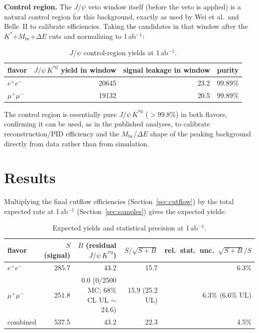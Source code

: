 \documentclass[11pt]{article}
\newcommand{\Kst}{K^{*0}}
\newcommand{\Mbc}{M_{\mathrm{bc}}}
\newcommand{\dE}{\Delta E}
\newcommand{\jpsi}{J/\psi}
\begin{document}
\textbf{Control region.} The $\jpsi$ veto window itself (before the
veto is applied) is a natural control region for this background,
exactly as used by Wei et al.\ and Belle~II to calibrate efficiencies.
Taking the candidates in that window after the $K^{*}$+$\Mbc$+$\dE$ cuts
and normalizing to 1\,ab$^{-1}$:

\begin{table}[htbp]
\centering
\begin{tabular}{lrrr}
\toprule
flavor & $\jpsi\,\Kst$ yield in window & signal leakage in window & purity \\
\midrule
$e^+e^-$ & 20645 & 23.2 & 99.89\% \\
$\mu^+\mu^-$ & 19132 & 20.5 & 99.89\% \\
\bottomrule
\end{tabular}
\caption{$\jpsi$ control-region yields at 1\,ab$^{-1}$.}
\label{tab:cr}
\end{table}

The control region is essentially pure $\jpsi\,\Kst$ ($>$99.8\%) in
both flavors, confirming it can be used, as in the published analyses,
to calibrate reconstruction/PID efficiency and the $\Mbc$/$\dE$ shape of
the peaking background directly from data rather than from simulation.

\section{Results}
\label{sec:results}

Multiplying the final cutflow efficiencies (Section~\ref{sec:cutflow})
by the total expected rate at 1\,ab$^{-1}$ (Section~\ref{sec:samples})
gives the expected yields:

\begin{table}[htbp]
\centering\footnotesize
\setlength{\tabcolsep}{5pt}
\begin{tabular}{lrrrr}
\toprule
flavor & $S$ (signal) & $B$ (residual $\jpsi\,\Kst$) & $S/\sqrt{S+B}$ & rel.\ stat.\ unc.\ $\sqrt{S+B}/S$ \\
\midrule
$e^+e^-$ & 285.7 & 43.2 & 15.7 & 6.3\% \\
$\mu^+\mu^-$ & 251.8 & 0.0 (0/2500 MC; 68\% CL UL $\sim$ 24.6) & 15.9 (25.2 UL) & 6.3\% (6.6\% UL) \\
combined & 537.5 & 43.2 & 22.3 & 4.5\% \\
\bottomrule
\end{tabular}
\caption{Expected yields and statistical precision at 1\,ab$^{-1}$.}
\label{tab:results}
\end{table}
\end{document}
